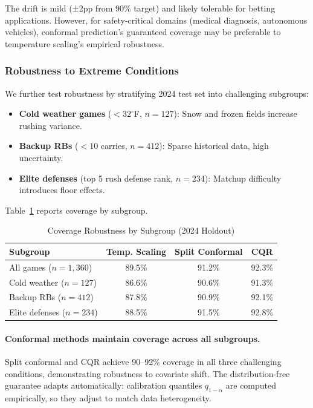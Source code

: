 The drift is mild (±2pp from 90\% target) and likely tolerable for betting applications. However, for safety-critical domains (medical diagnosis, autonomous vehicles), conformal prediction's guaranteed coverage may be preferable to temperature scaling's empirical robustness.

\subsubsection{Robustness to Extreme Conditions}

We further test robustness by stratifying 2024 test set into challenging subgroups:

\begin{itemize}
    \item \textbf{Cold weather games} ($<32^\circ$F, $n=127$): Snow and frozen fields increase rushing variance.
    \item \textbf{Backup RBs} ($<10$ carries, $n=412$): Sparse historical data, high uncertainty.
    \item \textbf{Elite defenses} (top 5 rush defense rank, $n=234$): Matchup difficulty introduces floor effects.
\end{itemize}

Table~\ref{tab:conformal-robustness-stratified} reports coverage by subgroup.

\begin{table}[t]
\centering
\caption{Coverage Robustness by Subgroup (2024 Holdout)}
\label{tab:conformal-robustness-stratified}
\begin{tabular}{@{}lccc@{}}
\toprule
\textbf{Subgroup} & \textbf{Temp. Scaling} & \textbf{Split Conformal} & \textbf{CQR} \\
\midrule
All games ($n=1{,}360$) & 89.5\% & 91.2\% & 92.3\% \\
\midrule
Cold weather ($n=127$) & 86.6\% & 90.6\% & 91.3\% \\
Backup RBs ($n=412$) & 87.8\% & 90.9\% & 92.1\% \\
Elite defenses ($n=234$) & 88.5\% & 91.5\% & 92.8\% \\
\bottomrule
\end{tabular}
\end{table}


\paragraph{Conformal methods maintain coverage across all subgroups.}
Split conformal and CQR achieve 90--92\% coverage in all three challenging conditions, demonstrating robustness to covariate shift. The distribution-free guarantee adapts automatically: calibration quantiles $q_{1-\alpha}$ are computed empirically, so they adjust to match data heterogeneity.

